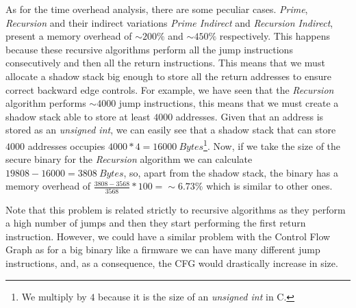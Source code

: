 As for the time overhead analysis, there are some peculiar cases. \textit{Prime},
\textit{Recursion} and their indirect variations \textit{Prime Indirect} and \textit{Recursion
Indirect}, present a memory overhead of $\sim 200\%$ and $\sim 450\%$ respectively.
This happens because these recursive algorithms perform all the jump
instructions consecutively and then all the return instructions. This means that
we must allocate a shadow stack big enough to store all the return addresses to ensure
correct backward edge controls. For example, we have seen that the \textit{Recursion}
algorithm performs $\sim 4000$ jump instructions, this means that we must create
a shadow stack able to store at least $4000$ addresses. Given that an address is
stored as an \textit{unsigned int}, we can easily see that a shadow stack that
can store $4000$ addresses occupies $4000*4 = 16000 \ \textit{Bytes}$\footnote{We
multiply by $4$ because it is the size of an \textit{unsigned int} in C.}. Now, if
we take the size of the secure binary for the \textit{Recursion} algorithm we
can calculate $19808 - 16000 = 3808 \ \textit{Bytes}$, so, apart from the shadow
stack, the binary has a memory overhead of $\frac{3808-3568}{3568}*100 = \sim 6.
73\%$ which is similar to other ones.

Note that this problem is related strictly to recursive algorithms as they perform
a high number of jumps and then they start performing the first return instruction.
However, we could have a similar problem with the Control Flow Graph as for a big
binary like a firmware we can have many different jump instructions, and, as a consequence,
the CFG would drastically increase in size.

